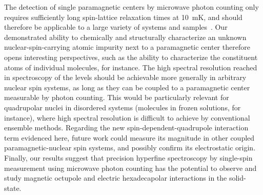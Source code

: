 The detection of single paramagnetic centers by microwave photon counting only requires sufficiently long spin-lattice relaxation times at 10~mK, and should therefore be applicable to a large variety of systems and samples~. Our demonstrated ability to chemically and structurally characterize an unknown nuclear-spin-carrying atomic impurity next to a paramagnetic center therefore opens interesting perspectives, such as the ability to characterize the constituent atoms of individual molecules, for instance. The high spectral resolution reached in spectroscopy of the \Nb levels should be achievable more generally in arbitrary nuclear spin systems, as long as they can be coupled to a paramagnetic center measurable by photon counting. This would be particularly relevant for quadrupolar nuclei in disordered systems (molecules in frozen solutions, for instance), where high spectral resolution is difficult to achieve by conventional ensemble methods. Regarding the new spin-dependent-quadrupole interaction term evidenced here, future work could measure its magnitude in other coupled paramagnetic-nuclear spin systems, and possibly confirm its electrostatic origin. Finally, our results suggest that precision hyperfine spectroscopy by single-spin measurement using microwave photon counting has the potential to observe and study magnetic octupole and electric hexadecapolar interactions in the solid-state.